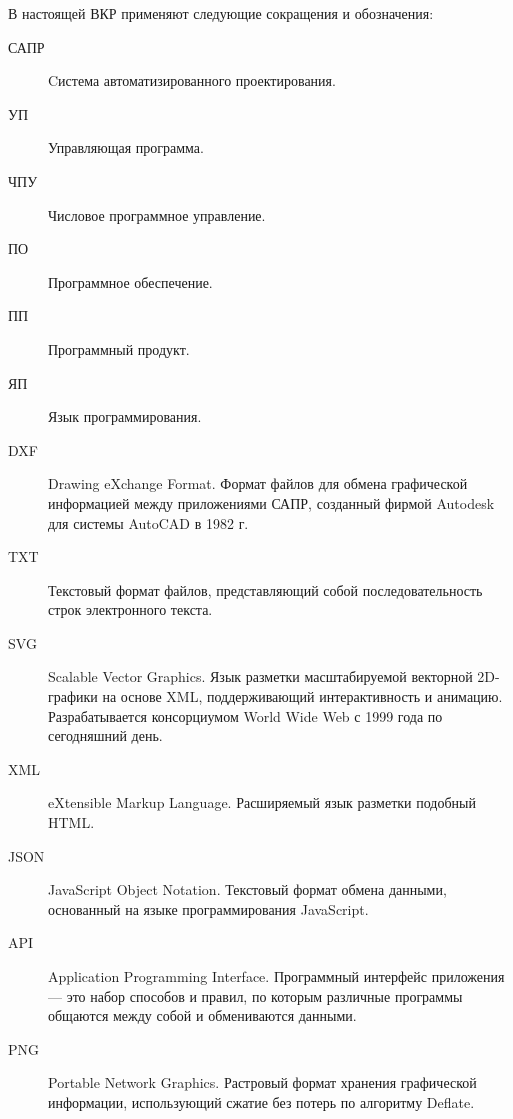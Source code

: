 \Abbreviations %

В настоящей ВКР применяют следующие сокращения и обозначения:

\begin{description}
	
\item[САПР] Cистема автоматизированного проектирования.

\item[УП] Управляющая программа.

\item[ЧПУ] Числовое программное управление.

\item[ПО] Программное обеспечение.

\item[ПП] Программный продукт.

\item[ЯП] Язык программирования.

\item[DXF] Drawing eXchange Format. Формат файлов для обмена графической информацией между приложениями САПР, созданный фирмой Autodesk для системы AutoCAD в 1982 г.

\item[TXT] Текстовый формат файлов, представляющий собой последовательность строк электронного текста.

\item[SVG] Scalable Vector Graphics. Язык разметки масштабируемой векторной 2D-графики на основе XML, поддерживающий интерактивность и анимацию. Разрабатывается консорциумом World Wide Web с 1999 года по сегодняшний день.

\item[XML] eXtensible Markup Language. Расширяемый язык разметки подобный HTML.

\item[JSON] JavaScript Object Notation. Текстовый формат обмена данными, основанный на языке программирования JavaScript.

\item[API] Application Programming Interface. Программный интерфейс приложения --- это набор способов и правил, по которым различные программы общаются между собой и обмениваются данными.

\item[PNG] Portable Network Graphics. Растровый формат хранения графической информации, использующий сжатие без потерь по алгоритму Deflate.

\end{description}

